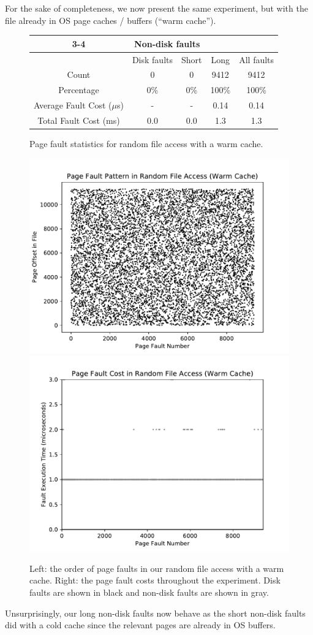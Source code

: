 \documentclass{article}
\begin{document}
	For the sake of completeness, we now present the same experiment, but with the file already in OS page caches / buffers (``warm cache'').
	
	\begin{figure}[ht!]
		\centering
		\begin{tabular}{|c|c|c|c|c|}
			\cline{3-4}\multicolumn{2}{}{}&\multicolumn{2}{|c|}{Non-disk faults}\\
			\hline & Disk faults & Short & Long & All faults\\\hline
			Count & 0 & 0 & 9412 & 9412\\
			Percentage & 0\% & 0\% & 100\% & 100\% \\
			Average Fault Cost ($\mu$s) & - & - & 0.14 & 0.14\\
			Total Fault Cost (ms) & 0.0 & 0.0 & 1.3 & 1.3 \\\hline
		\end{tabular}
		\caption{Page fault statistics for random file access with a warm cache.}
	\end{figure}\vspace*{-20pt}
	\begin{figure}[ht!]
		\centering
		\includegraphics[width=0.43\linewidth, trim=0cm 0.4cm 0.4cm 0.4cm]{figures/warmrandom1.pdf}
		\includegraphics[width=0.43\linewidth, trim=0cm 0.4cm 0.4cm 0.4cm]{figures/warmrandom2.pdf}
		\caption{Left: the order of page faults in our random file access with a warm cache. Right: the page fault costs throughout the experiment. Disk faults are shown in black and non-disk faults are shown in gray.}
	\end{figure}
	
	Unsurprisingly, our long non-disk faults now behave as the short non-disk faults did with a cold cache since the relevant pages are already in OS buffers.\\
	
\end{document}
